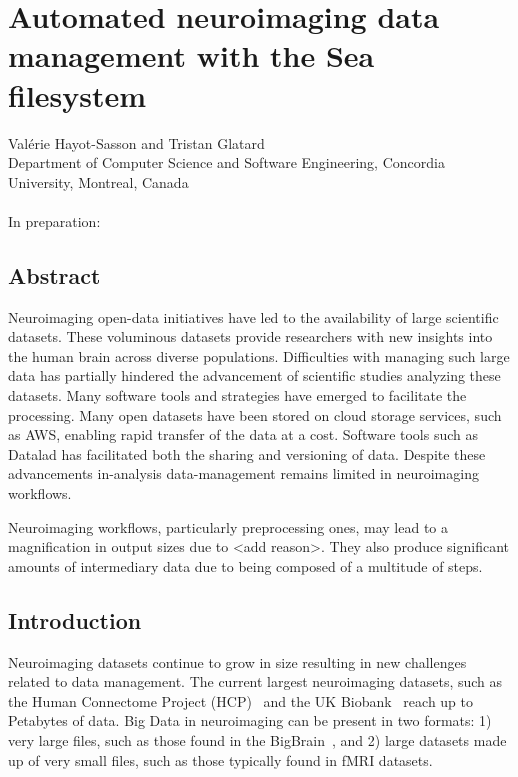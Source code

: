 \chapter{Automated neuroimaging data management with the Sea filesystem}

Val\'erie Hayot-Sasson and Tristan Glatard \\
\begingroup \footnotesize
Department of Computer Science and Software Engineering, Concordia University, Montreal, Canada \\
\endgroup 
\vspace{5pt} \\
In preparation: \\

\section{Abstract}
	Neuroimaging open-data initiatives have led to the availability of large scientific datasets. These voluminous
	datasets provide researchers with new insights into the human brain across diverse populations. Difficulties with
	managing such large data has partially hindered the advancement of scientific studies analyzing these datasets. Many
	software tools and strategies have emerged to facilitate the processing. Many open datasets have been stored on cloud storage
	services, such as AWS, enabling rapid transfer of the data at a cost. Software tools such as Datalad has facilitated both the
	sharing and versioning of data. Despite these advancements in-analysis data-management remains limited in neuroimaging workflows.
    
	Neuroimaging workflows, particularly preprocessing ones, may lead to a magnification in output sizes due to <add reason>. They also produce
	significant amounts of intermediary data due to being composed of a multitude of steps. 

    \section{Introduction}\label{sec:sea_neuro:introduction}
    
    Neuroimaging datasets continue to grow in size resulting in new challenges related
    to data management. The current largest neuroimaging datasets, such as the Human Connectome Project (HCP)~\cite{HCP}
    and the UK Biobank~\cite{ukbiobank} reach up to Petabytes of data. Big Data in neuroimaging can be present in two formats: 1)
    very large files, such as those found in the BigBrain~\cite{bigbrain}, and 2) large datasets made up of very small files,
    such as those typically found in fMRI datasets. 
    
